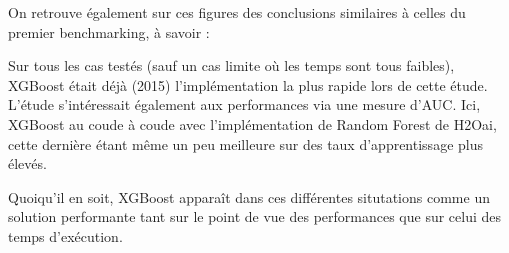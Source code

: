 On retrouve également sur ces figures des conclusions similaires à celles du premier benchmarking, à savoir :
\begin{itemize}
	Sur tous les cas testés (sauf un cas limite où les temps sont tous faibles), XGBoost était déjà (2015) l'implémentation la plus rapide lors de cette étude.
	L'étude s'intéressait également aux performances via une mesure d'AUC. Ici, XGBoost au coude à coude avec l'implémentation de Random Forest de H2Oai, cette dernière étant même un peu meilleure sur des taux d'apprentissage plus élevés.
\end{itemize}
Quoiqu'il en soit, XGBoost apparaît dans ces différentes situtations comme un solution performante tant sur le point de vue des performances que sur celui des temps d'exécution.
